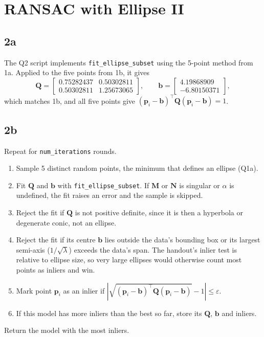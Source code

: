\documentclass[11pt]{article}
\newcommand{\vect}[1]{\mathbf{#1}}
\newcommand{\mat}[1]{\mathbf{#1}}
\begin{document}
\clearpage
\section{RANSAC with Ellipse II}

\subsection*{2a}

The Q2 script implements \texttt{fit\_ellipse\_subset} using the 5-point method from 1a. Applied to the five points from 1b, it gives
\begin{equation*}
    \mat{Q} = \begin{bmatrix} 0.75282437 & 0.50302811 \\ 0.50302811 & 1.25673065 \end{bmatrix},
    \qquad
    \vect{b} = \begin{bmatrix} 4.19868909 \\ -6.80150371 \end{bmatrix},
\end{equation*}
which matches 1b, and all five points give $(\vect{p}_i - \vect{b})^\top\mat{Q}(\vect{p}_i - \vect{b}) = 1$.

\subsection*{2b}

Repeat for \texttt{num\_iterations} rounds.
\begin{enumerate}
    \item Sample 5 distinct random points, the minimum that defines an ellipse (Q1a).
    \item Fit $\mat{Q}$ and $\vect{b}$ with \texttt{fit\_ellipse\_subset}. If $\mat{M}$ or $\mat{N}$ is singular or $\alpha$ is undefined, the fit raises an error and the sample is skipped.
    \item Reject the fit if $\mat{Q}$ is not positive definite, since it is then a hyperbola or degenerate conic, not an ellipse.
    \item Reject the fit if its centre $\vect{b}$ lies outside the data's bounding box or its largest semi-axis ($1/\sqrt{\lambda}$) exceeds the data's span. The handout's inlier test is relative to ellipse size, so very large ellipses would otherwise count most points as inliers and win.
    \item Mark point $\vect{p}_i$ as an inlier if $\left|\sqrt{(\vect{p}_i - \vect{b})^\top\mat{Q}(\vect{p}_i - \vect{b})} - 1\right| \leq \varepsilon$.
    \item If this model has more inliers than the best so far, store its $\mat{Q}$, $\vect{b}$ and inliers.
\end{enumerate}
Return the model with the most inliers.
\end{document}
